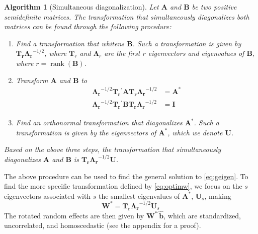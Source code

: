 \documentclass[12pt]{article} %
\newtheorem{algorithm}[theorem]{Algorithm}
\newcommand{\trans}{\ensuremath{^\prime}}
\DeclareMathOperator{\rank}{rank}
\begin{document}
\begin{algorithm}[Simultaneous diagonalization]
Let $\bm{A}$ and $\bm{B}$ be two positive semidefinite matrices. The transformation that simultaneously diagonalizes both matrices can be found through the following procedure:
\begin{enumerate}
\item Find a transformation that whitens $\bm{B}$. Such a transformation is given by $\bm{T_r \Lambda_r}^{-1/2}$, where $\bm{T}_r$ and $\bm{\Lambda}_r$ are the first $r$  eigenvectors and eigenvalues of $\bm{B}$, where $r = \rank(\bm{B})$. 

\item Transform $\bm{A}$ and $\bm{B}$ to
\begin{align}
\bm{\Lambda_r}^{-1/2} \bm{T_r}\trans \bm{A T_r \Lambda_r}^{-1/2} &= \bm{A}^* \label{eq:astar} \\
\bm{\Lambda_r}^{-1/2} \bm{T_r}\trans \bm{B T_r \Lambda_r}^{-1/2} &= \bm{I}
\end{align}

\item Find an orthonormal transformation that diagonalizes $\bm{A}^*$. Such a transformation is given by the eigenvectors of $\bm{A}^*$, which we denote $\bm{U}$.
\end{enumerate}

\noindent
Based on the above three steps, the transformation that simultaneously diagonalizes $\bm{A}$ and $\bm{B}$ is $\bm{T_r \Lambda_r}^{-1/2} \bm{U}$.\\ 
\end{algorithm}

The above procedure can be used to find the general solution to \eqref{eq:geigen}. To find the more specific transformation defined by \eqref{eq:optimw}, we focus on the $s$ eigenvectors associated with $s$ the smallest eigenvalues of $\bm{A}^*$, $\bm{U}_s$, making
%
\begin{equation}\label{eq:w}
\bm{W}^* = \bm{T_r \Lambda_r}^{-1/2} \bm{U}_s
\end{equation}
%
The rotated random effects are then given by $\bm{W}^{*\prime} \widehat{\bm{b}}$, which are standardized, uncorrelated, and homoscedastic (see the appendix for a proof).

\end{document}
